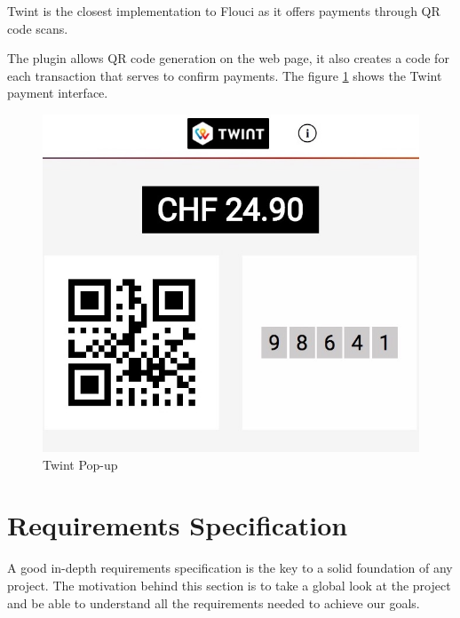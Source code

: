 \begin{spacing}{1.2}
\begin{itemize}
Twint \cite{twint} is the closest implementation to Flouci as it offers payments through QR code scans.

The plugin allows QR code generation on the web page, it also creates a code for each transaction that serves to confirm payments.
The figure \ref{fig:twint} shows the Twint payment interface.
\begin{figure}[!ht]\centering
\includegraphics[scale=0.4]{twint.jpg}
\caption{Twint Pop-up}
\label{fig:twint}
\end{figure}
  \end{itemize}
  
  

\section{Requirements Specification}
A good in-depth requirements specification is the key to a solid foundation of any project.
The motivation behind this section is to take a global look at the project and be able to understand all the requirements needed to achieve our goals.

\end{spacing}

